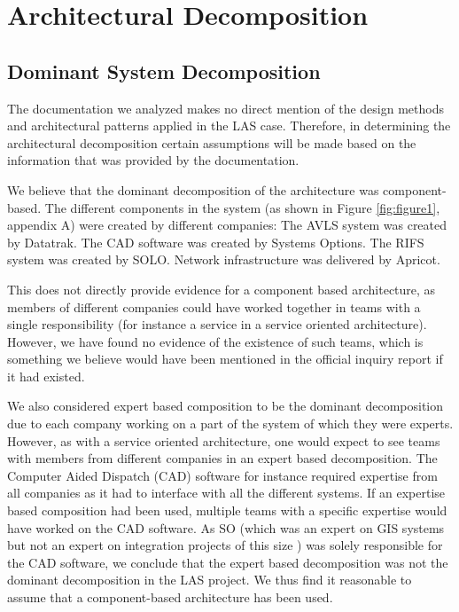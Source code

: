 \section*{Architectural Decomposition}

\subsection*{Dominant System Decomposition}

The documentation we analyzed makes no direct mention of the design methods and architectural patterns applied in the LAS case.
Therefore, in determining the architectural decomposition certain assumptions will be made based on the information that was provided by the documentation.

We believe that the dominant decomposition of the architecture was component-based.
The different components in the system (as shown in Figure \ref{fig:figure1}, appendix A) were created by different companies:
The AVLS system was created by Datatrak.
The CAD software was created by Systems Options.
The RIFS system was created by SOLO.
Network infrastructure was delivered by Apricot.

This does not directly provide evidence for a component based architecture, as members of different companies could have worked together in teams with a single responsibility
(for instance a service in a service oriented architecture).
However, we have found no evidence of the existence of such teams, which is something we believe would have been mentioned in the official inquiry report \autocite{officialreport} if it had existed.

We also considered expert based composition to be the dominant decomposition due to each company working on a part of the system of which they were experts.
However, as with a service oriented architecture, one would expect to see teams with members from different companies in an expert based decomposition.
The Computer Aided Dispatch (CAD) software for instance required expertise from all companies as it had to interface with all the different systems.
If an expertise based composition had been used, multiple teams with a specific expertise would have worked on the CAD software.
As SO (which was an expert on GIS systems \autocite{techsum} but not an expert on integration projects of this size \autocite[3078]{officialreport}) was solely responsible for the CAD software,
we conclude that the expert based decomposition was not the dominant decomposition in the LAS project.
We thus find it reasonable to assume that a component-based architecture has been used.

